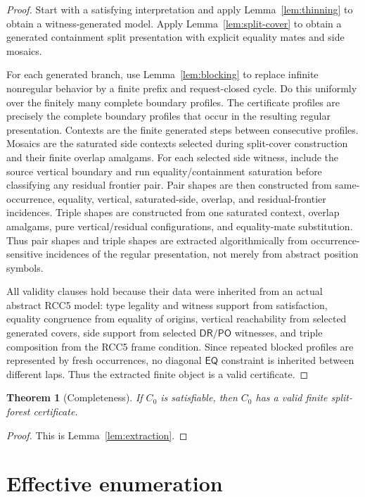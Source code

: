 \documentclass[11pt]{article}
\newtheorem{theorem}{Theorem}[section]
\newcommand{\EQ}{\mathsf{EQ}}
\newcommand{\PO}{\mathsf{PO}}
\newcommand{\DR}{\mathsf{DR}}
\begin{document}
\begin{proof}
Start with a satisfying interpretation and apply Lemma~\ref{lem:thinning} to obtain a witness-generated model.  Apply Lemma~\ref{lem:split-cover} to obtain a generated containment split presentation with explicit equality mates and side mosaics.

For each generated branch, use Lemma~\ref{lem:blocking} to replace infinite nonregular behavior by a finite prefix and request-closed cycle.  Do this uniformly over the finitely many complete boundary profiles.  The certificate profiles are precisely the complete boundary profiles that occur in the resulting regular presentation.  Contexts are the finite generated steps between consecutive profiles.  Mosaics are the saturated side contexts selected during split-cover construction and their finite overlap amalgams.  For each selected side witness, include the source vertical boundary and run equality/containment saturation before classifying any residual frontier pair.  Pair shapes are then constructed from same-occurrence, equality, vertical, saturated-side, overlap, and residual-frontier incidences.  Triple shapes are constructed from one saturated context, overlap amalgams, pure vertical/residual configurations, and equality-mate substitution.  Thus pair shapes and triple shapes are extracted algorithmically from occurrence-sensitive incidences of the regular presentation, not merely from abstract position symbols.

All validity clauses hold because their data were inherited from an actual abstract RCC5 model: type legality and witness support from satisfaction, equality congruence from equality of origins, vertical reachability from selected generated covers, side support from selected \(\DR/\PO\) witnesses, and triple composition from the RCC5 frame condition.  Since repeated blocked profiles are represented by fresh occurrences, no diagonal \(\EQ\) constraint is inherited between different laps.  Thus the extracted finite object is a valid certificate.
\end{proof}

\begin{theorem}[Completeness]
If \(C_0\) is satisfiable, then \(C_0\) has a valid finite split-forest certificate.
\end{theorem}

\begin{proof}
This is Lemma~\ref{lem:extraction}.
\end{proof}

\section{Effective enumeration}
\end{document}
